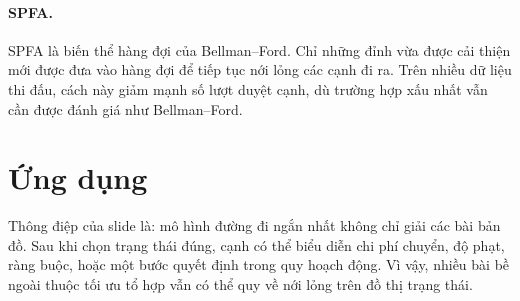 \documentclass[11pt]{article}
\begin{document}
\paragraph{SPFA.}
SPFA là biến thể hàng đợi của Bellman--Ford. Chỉ những đỉnh vừa được cải thiện
mới được đưa vào hàng đợi để tiếp tục nới lỏng các cạnh đi ra. Trên nhiều dữ
liệu thi đấu, cách này giảm mạnh số lượt duyệt cạnh, dù trường hợp xấu nhất
vẫn cần được đánh giá như Bellman--Ford.

\section{Ứng dụng}

Thông điệp của slide là: mô hình đường đi ngắn nhất không chỉ giải các bài
bản đồ. Sau khi chọn trạng thái đúng, cạnh có thể biểu diễn chi phí chuyển,
độ phạt, ràng buộc, hoặc một bước quyết định trong quy hoạch động. Vì vậy,
nhiều bài bề ngoài thuộc tối ưu tổ hợp vẫn có thể quy về nới lỏng trên đồ
thị trạng thái.
\end{document}

